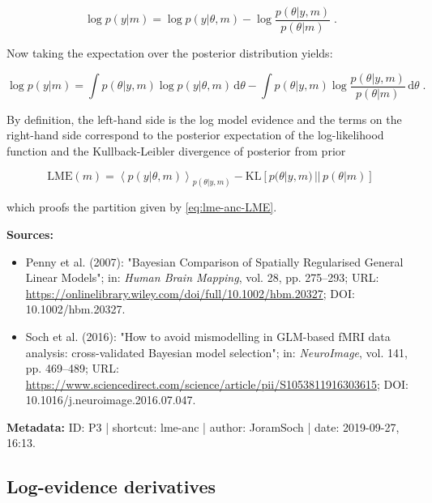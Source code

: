 \documentclass[a4paper,12pt]{book}
\begin{document}
\begin{equation} \label{eq:lme-anc-AnC-s3}
\log p(y|m) = \log p(y|\theta,m) - \log \frac{p(\theta|y,m)}{p(\theta|m)} \; .
\end{equation}

Now taking the expectation over the posterior distribution yields:

\begin{equation} \label{eq:lme-anc-AnC-s4}
\log p(y|m) = \int p(\theta|y,m) \log p(y|\theta,m) \, \mathrm{d}\theta - \int p(\theta|y,m) \log \frac{p(\theta|y,m)}{p(\theta|m)} \, \mathrm{d}\theta \; .
\end{equation}

By definition, the left-hand side is the log model evidence and the terms on the right-hand side correspond to the posterior expectation of the log-likelihood function and the Kullback-Leibler divergence of posterior from prior

\begin{equation} \label{eq:lme-anc-LME-AnC}
\mathrm{LME}(m) = \left\langle p(y|\theta,m) \right\rangle_{p(\theta|y,m)} - \mathrm{KL} \left[ p(\theta|y,m) \, || \, p(\theta|m) \right]
\end{equation}

which proofs the partition given by \eqref{eq:lme-anc-LME}.

\vspace{1em}
\textbf{Sources:}
\begin{itemize}
\item Penny et al. (2007): "Bayesian Comparison of Spatially Regularised General Linear Models"; in: \textit{Human Brain Mapping}, vol. 28, pp. 275–293; URL: \url{https://onlinelibrary.wiley.com/doi/full/10.1002/hbm.20327}; DOI: 10.1002/hbm.20327.
\item Soch et al. (2016): "How to avoid mismodelling in GLM-based fMRI data analysis: cross-validated Bayesian model selection"; in: \textit{NeuroImage}, vol. 141, pp. 469–489; URL: \url{https://www.sciencedirect.com/science/article/pii/S1053811916303615}; DOI: 10.1016/j.neuroimage.2016.07.047.
\end{itemize}


\vspace{1em}
\textbf{Metadata:} ID: P3 | shortcut: lme-anc | author: JoramSoch | date: 2019-09-27, 16:13.


\subsection{Log-evidence derivatives}
\end{document}
